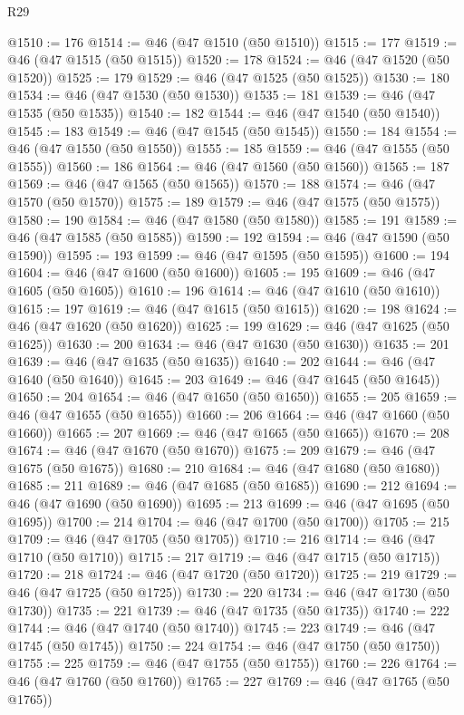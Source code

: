 \begin{lexlean}{R29}
\begin{coremodule}
@1510 := 176
@1514 := @46 (@47 @1510 (@50 @1510))
@1515 := 177
@1519 := @46 (@47 @1515 (@50 @1515))
@1520 := 178
@1524 := @46 (@47 @1520 (@50 @1520))
@1525 := 179
@1529 := @46 (@47 @1525 (@50 @1525))
@1530 := 180
@1534 := @46 (@47 @1530 (@50 @1530))
@1535 := 181
@1539 := @46 (@47 @1535 (@50 @1535))
@1540 := 182
@1544 := @46 (@47 @1540 (@50 @1540))
@1545 := 183
@1549 := @46 (@47 @1545 (@50 @1545))
@1550 := 184
@1554 := @46 (@47 @1550 (@50 @1550))
@1555 := 185
@1559 := @46 (@47 @1555 (@50 @1555))
@1560 := 186
@1564 := @46 (@47 @1560 (@50 @1560))
@1565 := 187
@1569 := @46 (@47 @1565 (@50 @1565))
@1570 := 188
@1574 := @46 (@47 @1570 (@50 @1570))
@1575 := 189
@1579 := @46 (@47 @1575 (@50 @1575))
@1580 := 190
@1584 := @46 (@47 @1580 (@50 @1580))
@1585 := 191
@1589 := @46 (@47 @1585 (@50 @1585))
@1590 := 192
@1594 := @46 (@47 @1590 (@50 @1590))
@1595 := 193
@1599 := @46 (@47 @1595 (@50 @1595))
@1600 := 194
@1604 := @46 (@47 @1600 (@50 @1600))
@1605 := 195
@1609 := @46 (@47 @1605 (@50 @1605))
@1610 := 196
@1614 := @46 (@47 @1610 (@50 @1610))
@1615 := 197
@1619 := @46 (@47 @1615 (@50 @1615))
@1620 := 198
@1624 := @46 (@47 @1620 (@50 @1620))
@1625 := 199
@1629 := @46 (@47 @1625 (@50 @1625))
@1630 := 200
@1634 := @46 (@47 @1630 (@50 @1630))
@1635 := 201
@1639 := @46 (@47 @1635 (@50 @1635))
@1640 := 202
@1644 := @46 (@47 @1640 (@50 @1640))
@1645 := 203
@1649 := @46 (@47 @1645 (@50 @1645))
@1650 := 204
@1654 := @46 (@47 @1650 (@50 @1650))
@1655 := 205
@1659 := @46 (@47 @1655 (@50 @1655))
@1660 := 206
@1664 := @46 (@47 @1660 (@50 @1660))
@1665 := 207
@1669 := @46 (@47 @1665 (@50 @1665))
@1670 := 208
@1674 := @46 (@47 @1670 (@50 @1670))
@1675 := 209
@1679 := @46 (@47 @1675 (@50 @1675))
@1680 := 210
@1684 := @46 (@47 @1680 (@50 @1680))
@1685 := 211
@1689 := @46 (@47 @1685 (@50 @1685))
@1690 := 212
@1694 := @46 (@47 @1690 (@50 @1690))
@1695 := 213
@1699 := @46 (@47 @1695 (@50 @1695))
@1700 := 214
@1704 := @46 (@47 @1700 (@50 @1700))
@1705 := 215
@1709 := @46 (@47 @1705 (@50 @1705))
@1710 := 216
@1714 := @46 (@47 @1710 (@50 @1710))
@1715 := 217
@1719 := @46 (@47 @1715 (@50 @1715))
@1720 := 218
@1724 := @46 (@47 @1720 (@50 @1720))
@1725 := 219
@1729 := @46 (@47 @1725 (@50 @1725))
@1730 := 220
@1734 := @46 (@47 @1730 (@50 @1730))
@1735 := 221
@1739 := @46 (@47 @1735 (@50 @1735))
@1740 := 222
@1744 := @46 (@47 @1740 (@50 @1740))
@1745 := 223
@1749 := @46 (@47 @1745 (@50 @1745))
@1750 := 224
@1754 := @46 (@47 @1750 (@50 @1750))
@1755 := 225
@1759 := @46 (@47 @1755 (@50 @1755))
@1760 := 226
@1764 := @46 (@47 @1760 (@50 @1760))
@1765 := 227
@1769 := @46 (@47 @1765 (@50 @1765))

\end{coremodule}
\end{lexlean}
